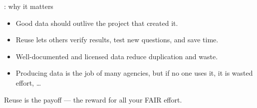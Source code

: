 \documentclass[aspectratio=169]{beamer}
\begin{document}
\begin{frame}{: why it matters}
\begin{itemize}
  \item Good data should outlive the project that created it.  
  \item Reuse lets others verify results, test new questions, and save time.  
  \item Well-documented and licensed data reduce duplication and waste.
  \item Producing data is the job of many agencies,  but if no one uses it, it is wasted effort, \ldots
\end{itemize}
\medskip
Reuse is the payoff — the reward for all your FAIR effort.
\end{frame}
\end{document}
